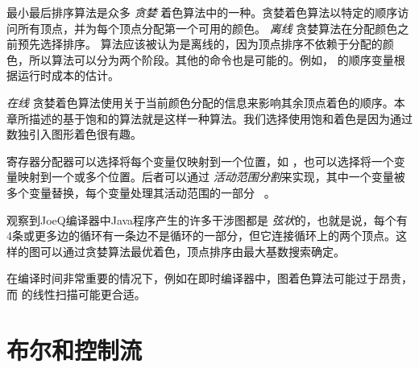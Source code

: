 \documentclass[11pt]{book}
\begin{document}
最小最后排序算法是众多 \emph{贪婪}
着色算法中的一种。贪婪着色算法以特定的顺序访问所有顶点，并为每个顶点分配第一个可用的颜色。 \emph{离线} 贪婪算法在分配颜色之前预先选择排序。
\citet{Chaitin:1981vl}算法应该被认为是离线的，因为顶点排序不依赖于分配的颜色，所以算法可以分为两个阶段。其他的命令也是可能的。例如， \citet{Chow:1984ys} 的顺序变量根据运行时成本的估计。

 \emph{在线} 贪婪着色算法使用关于当前颜色分配的信息来影响其余顶点着色的顺序。本章所描述的基于饱和的算法就是这样一种算法。我们选择使用饱和着色是因为通过数独引入图形着色很有趣。

寄存器分配器可以选择将每个变量仅映射到一个位置，如 \citet{Chaitin:1981vl}，也可以选择将一个变量映射到一个或多个位置。后者可以通过
\emph{活动范围分割}来实现，其中一个变量被多个变量替换，每个变量处理其活动范围的一部分~\citep{Chow:1984ys,Briggs:1994kx,Cooper:1998ly} 。






\citet{Palsberg:2007si} 观察到JoeQ编译器中Java程序产生的许多干涉图都是 \emph{弦状}的，也就是说，每个有4条或更多边的循环有一条边不是循环的一部分，但它连接循环上的两个顶点。这样的图可以通过贪婪算法最优着色，顶点排序由最大基数搜索确定。

在编译时间非常重要的情况下，例如在即时编译器中，图着色算法可能过于昂贵，而 \citet{Poletto:1999uq} 的线性扫描可能更合适。


\chapter{布尔和控制流}
\label{ch:Rif}
\end{document}
